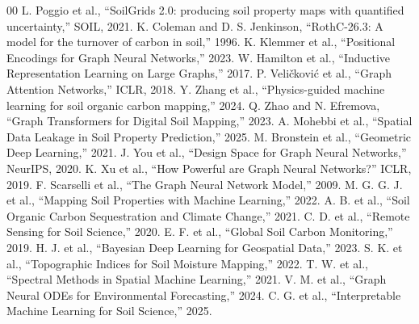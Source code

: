 \documentclass[conference]{IEEEtran}
\begin{document}
\begin{thebibliography}{00}
 L. Poggio et al., ``SoilGrids 2.0: producing soil property maps with quantified uncertainty,'' SOIL, 2021.
 K. Coleman and D. S. Jenkinson, ``RothC-26.3: A model for the turnover of carbon in soil,'' 1996.
 K. Klemmer et al., ``Positional Encodings for Graph Neural Networks,'' 2023.
 W. Hamilton et al., ``Inductive Representation Learning on Large Graphs,'' 2017.
 P. Veličković et al., ``Graph Attention Networks,'' ICLR, 2018.
 Y. Zhang et al., ``Physics-guided machine learning for soil organic carbon mapping,'' 2024.
 Q. Zhao and N. Efremova, ``Graph Transformers for Digital Soil Mapping,'' 2023.
 A. Mohebbi et al., ``Spatial Data Leakage in Soil Property Prediction,'' 2025.
 M. Bronstein et al., ``Geometric Deep Learning,'' 2021.
 J. You et al., ``Design Space for Graph Neural Networks,'' NeurIPS, 2020.
 K. Xu et al., ``How Powerful are Graph Neural Networks?'' ICLR, 2019.
 F. Scarselli et al., ``The Graph Neural Network Model,'' 2009.
 M. G. G. J. et al., ``Mapping Soil Properties with Machine Learning,'' 2022.
 A. B. et al., ``Soil Organic Carbon Sequestration and Climate Change,'' 2021.
 C. D. et al., ``Remote Sensing for Soil Science,'' 2020.
 E. F. et al., ``Global Soil Carbon Monitoring,'' 2019.
 H. J. et al., ``Bayesian Deep Learning for Geospatial Data,'' 2023.
 S. K. et al., ``Topographic Indices for Soil Moisture Mapping,'' 2022.
 T. W. et al., ``Spectral Methods in Spatial Machine Learning,'' 2021.
 V. M. et al., ``Graph Neural ODEs for Environmental Forecasting,'' 2024.
 C. G. et al., ``Interpretable Machine Learning for Soil Science,'' 2025.
\end{thebibliography}
\end{document}
